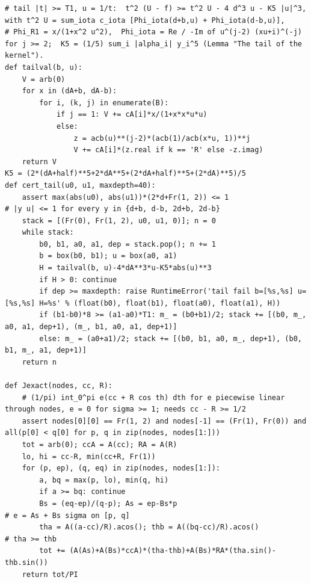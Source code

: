 \documentclass[11pt,reqno]{amsart}
\numberwithin{equation}{section}
\theoremstyle{definition}
\theoremstyle{remark}
\begin{document}
\begin{lstlisting}
# tail |t| >= T1, u = 1/t:  t^2 (U - f) >= t^2 U - 4 d^3 u - K5 |u|^3,  with t^2 U = sum_iota c_iota [Phi_iota(d+b,u) + Phi_iota(d-b,u)],
# Phi_R1 = x/(1+x^2 u^2),  Phi_iota = Re / -Im of u^(j-2) (xu+i)^(-j) for j >= 2;  K5 = (1/5) sum_i |alpha_i| y_i^5 (Lemma "The tail of the kernel").
def tailval(b, u):
    V = arb(0)
    for x in (dA+b, dA-b):
        for i, (k, j) in enumerate(B):
            if j == 1: V += cA[i]*x/(1+x*x*u*u)
            else:
                z = acb(u)**(j-2)*(acb(1)/acb(x*u, 1))**j
                V += cA[i]*(z.real if k == 'R' else -z.imag)
    return V
K5 = (2*(dA+half)**5+2*dA**5+(2*dA+half)**5+(2*dA)**5)/5
def cert_tail(u0, u1, maxdepth=40):
    assert max(abs(u0), abs(u1))*(2*d+Fr(1, 2)) <= 1                   # |y u| <= 1 for every y in {d+b, d-b, 2d+b, 2d-b}
    stack = [(Fr(0), Fr(1, 2), u0, u1, 0)]; n = 0
    while stack:
        b0, b1, a0, a1, dep = stack.pop(); n += 1
        b = box(b0, b1); u = box(a0, a1)
        H = tailval(b, u)-4*dA**3*u-K5*abs(u)**3
        if H > 0: continue
        if dep >= maxdepth: raise RuntimeError('tail fail b=[%s,%s] u=[%s,%s] H=%s' % (float(b0), float(b1), float(a0), float(a1), H))
        if (b1-b0)*8 >= (a1-a0)*T1: m_ = (b0+b1)/2; stack += [(b0, m_, a0, a1, dep+1), (m_, b1, a0, a1, dep+1)]
        else: m_ = (a0+a1)/2; stack += [(b0, b1, a0, m_, dep+1), (b0, b1, m_, a1, dep+1)]
    return n

def Jexact(nodes, cc, R):
    # (1/pi) int_0^pi e(cc + R cos th) dth for e piecewise linear through nodes, e = 0 for sigma >= 1; needs cc - R >= 1/2
    assert nodes[0][0] == Fr(1, 2) and nodes[-1] == (Fr(1), Fr(0)) and all(p[0] < q[0] for p, q in zip(nodes, nodes[1:]))
    tot = arb(0); ccA = A(cc); RA = A(R)
    lo, hi = cc-R, min(cc+R, Fr(1))
    for (p, ep), (q, eq) in zip(nodes, nodes[1:]):
        a, bq = max(p, lo), min(q, hi)
        if a >= bq: continue
        Bs = (eq-ep)/(q-p); As = ep-Bs*p                                 # e = As + Bs sigma on [p, q]
        tha = A((a-cc)/R).acos(); thb = A((bq-cc)/R).acos()               # tha >= thb
        tot += (A(As)+A(Bs)*ccA)*(tha-thb)+A(Bs)*RA*(tha.sin()-thb.sin())
    return tot/PI


\end{lstlisting}
\end{document}
